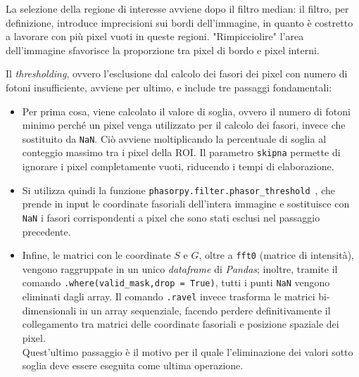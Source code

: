 La selezione della regione di interesse avviene dopo il filtro median: il filtro, per definizione, introduce imprecisioni sui bordi dell'immagine, in quanto è costretto a lavorare con più pixel vuoti in queste regioni. "Rimpicciolire" l'area dell'immagine sfavorisce la proporzione tra pixel di bordo e pixel interni.

Il \textit{thresholding}, ovvero l'esclusione dal calcolo dei fasori dei pixel con numero di fotoni insufficiente, avviene per ultimo, e include tre passaggi fondamentali:

\begin{itemize}[itemsep = 0.5pt, topsep = 4pt]
    \item Per prima cosa, viene calcolato il valore di soglia, ovvero il numero di fotoni minimo perché un pixel venga utilizzato per il calcolo dei fasori, invece che sostituito da \texttt{NaN}. Ciò avviene moltiplicando la percentuale di soglia al conteggio massimo tra i pixel della ROI.
    Il parametro \texttt{skipna} permette di ignorare i pixel completamente vuoti, riducendo i tempi di elaborazione.
    
    \item Si utilizza quindi la funzione \texttt{phasorpy.filter.\allowbreak phasor\_threshold}~\cite{christophgohlkePhasorpyPhasorpyV0122026}, che prende in input le coordinate fasoriali dell'intera immagine e sostituisce con \texttt{NaN} i fasori corrispondenti a pixel che sono stati esclusi nel passaggio precedente.
    
    \item Infine, le matrici con le coordinate $S$ e $G$, oltre a \texttt{fft0} (matrice di intensità), vengono raggruppate in un unico \textit{dataframe} di \textit{Pandas}; inoltre, tramite il comando \texttt{.where(valid\_mask,\allowbreak drop = True)}, tutti i punti \texttt{NaN} vengono eliminati dagli array.
    Il comando \texttt{.ravel} invece trasforma le matrici bi-dimensionali in un array sequenziale, facendo perdere definitivamente il collegamento tra matrici delle coordinate fasoriali e posizione spaziale dei pixel.\\
    Quest'ultimo passaggio è il motivo per il quale l'eliminazione dei valori sotto soglia deve essere eseguita come ultima operazione.
\end{itemize}  %

\vspace{15pt}



